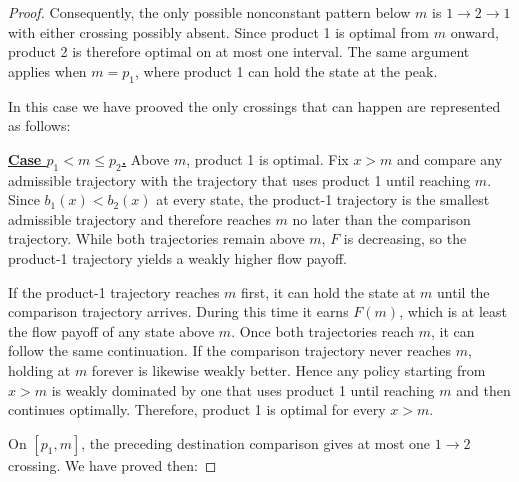 \documentclass[11pt]{article}
\begin{document}
\begin{proof}
Consequently, the only possible nonconstant pattern below $m$ is $1\to2\to1$ with either crossing possibly absent. Since product 1 is optimal from $m$ onward, product 2 is therefore optimal on at most one interval. The same argument applies when $m=p_1$, where product 1 can hold the state at the peak.

In this case we have prooved the only crossings that can happen are represented as  follows:

\begin{figure}[H]
\centering
{}
\end{figure}

\medskip\noindent\underline{\textbf{\boldmath Case $p_1<m\le p_2$.}}
Above $m$, product 1 is optimal. Fix $x>m$ and compare any admissible trajectory with the trajectory that uses product 1 until reaching $m$.
Since $b_1(x)<b_2(x)$ at every state, the product-1 trajectory is the smallest admissible trajectory and therefore reaches $m$ no later than the comparison trajectory. While both trajectories remain above $m$,
$F$ is decreasing, so the product-1 trajectory yields a weakly higher flow payoff.

If the product-1 trajectory reaches $m$ first, it can hold the state at $m$ until the comparison trajectory arrives. During this time it earns $F(m)$, which is at least the flow payoff of any state above $m$. Once both trajectories reach $m$, it can follow the same continuation. If the comparison trajectory never reaches $m$, holding at $m$ forever
is likewise weakly better. Hence any policy starting from $x>m$ is weakly dominated by one that uses product 1 until reaching $m$ and then continues optimally. Therefore, product 1 is optimal for every $x>m$.

On $[p_1,m]$, the preceding destination comparison gives at most one $1\to2$ crossing. We have proved then:


\end{proof}
\end{document}
